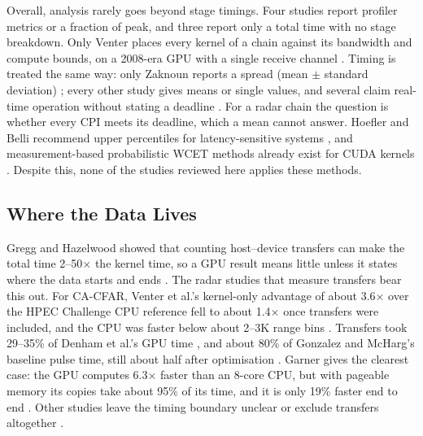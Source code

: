 Overall, analysis rarely goes beyond stage timings. Four studies report profiler metrics or a fraction of peak,
and three report only a total time with no stage breakdown. Only Venter places every kernel of a chain against its bandwidth and compute bounds, on a 2008-era GPU with a single receive channel \cite{venterSOFTWAREDEFINEDPULSEDOPPLERRADAR}. Timing is treated the same way: only Zaknoun reports a spread (mean $\pm$ standard deviation) \cite{zaknounRealTimeGPUacceleratedProcessing}; every other study gives means or single values, and several claim real-time operation without stating a deadline \cite{fangRealtimeImplementationPhased2024,pavlovImplementationSyntheticAperture2019,yangGPUOrientedDesignsConstant2022a}. For a radar chain the question is whether every CPI meets its deadline, which a mean cannot answer. Hoefler and Belli recommend upper percentiles for latency-sensitive systems \cite{hoeflerScientificBenchmarkingParallel2015a}, and measurement-based probabilistic WCET methods already exist for CUDA kernels \cite{berezovskyiWCETMeasurementbasedExtreme2014}. Despite this, none of the studies reviewed here applies these methods.

\subsection{Where the Data Lives}
\label{sec:data}
Gregg and Hazelwood showed that counting host--device transfers can make the total time 2--50$\times$ the kernel time,
so a GPU result means little unless it states where the data starts and ends \cite{greggWhereDataWhy2011a}.
The radar studies that measure transfers bear this out.
For CA-CFAR, Venter et al.'s kernel-only advantage of about 3.6$\times$ over the HPEC Challenge CPU reference fell to about 1.4$\times$ once transfers were included,
and the CPU was faster below about 2--3K range bins \cite{venterImplementationCACFARAlgorithm2011}.
Transfers took 29--35\% of Denham et al.'s GPU time \cite{denhamWeatherRadarData2018a},
and about 80\% of Gonzalez and McHarg's baseline pulse time, still about half after optimisation \cite{gonzalezCUDALibraryT2OURNAMINT}.
Garner gives the clearest case:
the GPU computes 6.3$\times$ faster than an 8-core CPU,
but with pageable memory its copies take about 95\% of its time,
and it is only 19\% faster end to end \cite{garnerTRADESPACEANALYSISHETEROGENEOUS2026}.
Other studies leave the timing boundary unclear \cite{zhaoGPUAcceleratedSignalProcessing2023}
or exclude transfers altogether \cite{yangGPUOrientedDesignsConstant2022a}.

